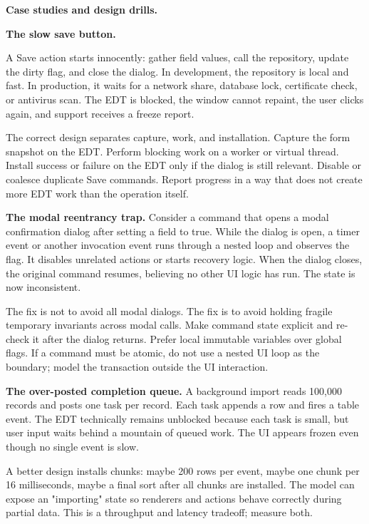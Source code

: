 \textbf{Case studies and design drills.}

\textbf{The slow save button.}

A Save action starts innocently: gather field values, call the repository, update the dirty flag, and close the dialog. In development, the repository is local and fast. In production, it waits for a network share, database lock, certificate check, or antivirus scan. The EDT is blocked, the window cannot repaint, the user clicks again, and support receives a freeze report.

The correct design separates capture, work, and installation. Capture the form snapshot on the EDT. Perform blocking work on a worker or virtual thread. Install success or failure on the EDT only if the dialog is still relevant. Disable or coalesce duplicate Save commands. Report progress in a way that does not create more EDT work than the operation itself.

\textbf{The modal reentrancy trap.} Consider a command that opens a modal confirmation dialog after setting a field  to true. While the dialog is open, a timer event or another invocation event runs through a nested loop and observes the flag. It disables unrelated actions or starts recovery logic. When the dialog closes, the original command resumes, believing no other UI logic has run. The state is now inconsistent.

The fix is not to avoid all modal dialogs. The fix is to avoid holding fragile temporary invariants across modal calls. Make command state explicit and re-check it after the dialog returns. Prefer local immutable variables over global flags. If a command must be atomic, do not use a nested UI loop as the boundary; model the transaction outside the UI interaction.

\textbf{The over-posted completion queue.} A background import reads 100,000 records and posts one  task per record. Each task appends a row and fires a table event. The EDT technically remains unblocked because each task is small, but user input waits behind a mountain of queued work. The UI appears frozen even though no single event is slow.

A better design installs chunks: maybe 200 rows per event, maybe one chunk per 16 milliseconds, maybe a final sort after all chunks are installed. The model can expose an "importing" state so renderers and actions behave correctly during partial data. This is a throughput and latency tradeoff; measure both.

